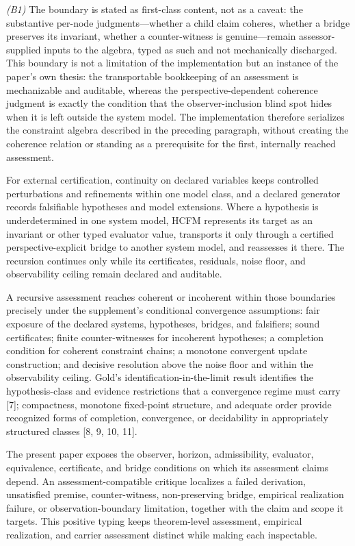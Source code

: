 \documentclass[11pt]{article}
\theoremstyle{definition}
\begin{document}
\emph{(B1)} The boundary is stated as first-class content, not as a caveat: the
substantive per-node judgments---whether a child claim coheres, whether a bridge
preserves its invariant, whether a counter-witness is genuine---remain
assessor-supplied inputs to the algebra, typed as such and not mechanically
discharged. This boundary is not a limitation of the implementation but an
instance of the paper's own thesis: the transportable bookkeeping of an
assessment is mechanizable and auditable, whereas the perspective-dependent
coherence judgment is exactly the condition that the observer-inclusion blind
spot hides when it is left outside the system model. The implementation therefore
serializes the constraint algebra described in the preceding paragraph, without creating the
coherence relation or standing as a prerequisite for the first, internally
reached assessment.

For external certification, continuity on declared variables keeps controlled perturbations and refinements within one model class, and a declared generator records falsifiable hypotheses and model extensions. Where a hypothesis is underdetermined in one system model, HCFM represents its target as an invariant or other typed evaluator value, transports it only through a certified perspective-explicit bridge to another system model, and reassesses it there. The recursion continues only while its certificates, residuals, noise floor, and observability ceiling remain declared and auditable.

A recursive assessment reaches coherent or incoherent within those boundaries precisely under the supplement's conditional convergence assumptions: fair exposure of the declared systems, hypotheses, bridges, and falsifiers; sound certificates; finite counter-witnesses for incoherent hypotheses; a completion condition for coherent constraint chains; a monotone convergent update construction; and decisive resolution above the noise floor and within the observability ceiling. Gold's identification-in-the-limit result identifies the hypothesis-class and evidence restrictions that a convergence regime must carry [7]; compactness, monotone fixed-point structure, and adequate order provide recognized forms of completion, convergence, or decidability in appropriately structured classes [8, 9, 10, 11].

The present paper exposes the observer, horizon, admissibility, evaluator, equivalence, certificate, and bridge conditions on which its assessment claims depend. An assessment-compatible critique localizes a failed derivation, unsatisfied premise, counter-witness, non-preserving bridge, empirical realization failure, or observation-boundary limitation, together with the claim and scope it targets. This positive typing keeps theorem-level assessment, empirical realization, and carrier assessment distinct while making each inspectable.
\end{document}
